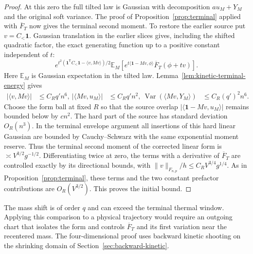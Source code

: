 \documentclass[11pt]{article}
\theoremstyle{definition}
\newcommand{\one}{\mathbf 1}
\newcommand{\E}{\mathbb E}
\newcommand{\Var}{\operatorname{Var}}
\begin{document}
\begin{proof}
At this zero the full tilted law is Gaussian with
decomposition \(a u_M+Y_M\) and the original soft variance.
The proof of Proposition~\ref{prop:terminal} applied with
\(\overline F_T\) now gives the terminal second moment. To
restore the earlier source put \(v=C_<\one\). Gaussian
translation in the earlier slices gives, including the shifted
quadratic factor, the exact generating function up to a positive
constant independent of \(t\):
\begin{equation}
 e^{t^2(\one^{\mathsf T}C_<\one-\langle v,Mv\rangle)/2}
 \E_{M}\!\left[e^{t\langle\one-Mv,\phi\rangle}
                 \overline F_T(\phi+t v)\right].
\end{equation}
Here \(\E_M\) is Gaussian expectation in the tilted law.
Lemma~\ref{lem:kinetic-terminal-energy} gives
\begin{equation}
 \begin{aligned}
 |\langle v,M v\rangle|&\le C_R q' n^6,\
 |\langle Mv,u_M\rangle|&\le C_R q' n^2,\
 \Var(\langle Mv,Y_M\rangle)&\le C_R(q')^2n^6 .
 \end{aligned}
\end{equation}
Choose the form ball at fixed \(R\) so that the source overlap
\(|\langle\one-Mv,u_M\rangle|\) remains bounded below by
\(c n^2\). The hard part of the source has standard deviation
\(O_R(n^3)\). In the terminal envelope argument all insertions
of this hard linear Gaussian are bounded by Cauchy--Schwarz
with the same exponential moment reserve. Thus the terminal
second moment of the corrected linear form is
\(\asymp V^{3/2}g^{-1/2}\). Differentiating twice at zero,
the terms with a derivative of \(\overline F_T\) are controlled
exactly by its directional bounds, with
\(\|v\|_{F_{n,p}}/h\le C_R V^{3/4}g^{1/4}\). As in
Proposition~\ref{prop:terminal}, these terms and the
two constant prefactor contributions are \(O_R(V^{3/2})\).
This proves the initial bound.
\end{proof}

The mass shift is of order \(q\) and can exceed the terminal thermal
window. Applying this comparison to a physical trajectory would
require an outgoing chart that isolates the form and controls
\(\overline F_T\) and its first variation near the recentered mass.
The four-dimensional proof uses backward kinetic shooting on the
shrinking domain of Section~\ref{sec:backward-kinetic}.

\end{document}
